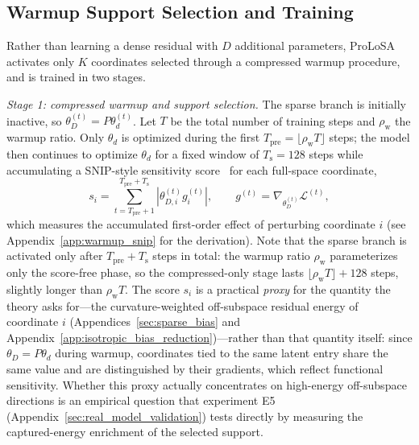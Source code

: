 \subsection{Warmup Support Selection and Training}
\label{sec:routed_sparse_adapter}

Rather than learning a dense residual with $D$ additional parameters, {ProLoSA} activates only $K$ coordinates selected through a compressed warmup procedure, and is trained in two stages.

\emph{Stage 1: compressed warmup and support selection.}
The sparse branch is initially inactive, so $\theta_D^{(t)}=P\theta_d^{(t)}$.
Let $T$ be the total number of training steps and $\rho_{\mathrm{w}}$ the warmup ratio.
Only $\theta_d$ is optimized during the first $T_{\mathrm{pre}}=\lfloor\rho_{\mathrm{w}}T\rfloor$ steps; the model then continues to optimize $\theta_d$ for a fixed window of $T_{\mathrm{s}}=128$ steps while accumulating a SNIP-style sensitivity score~\citep{lee2018snip,he2022sparseadapter} for each full-space coordinate,
\begin{equation}
s_i
=
\sum_{t=T_{\mathrm{pre}}+1}^{T_{\mathrm{pre}}+T_{\mathrm{s}}}
\left|
\theta_{D,i}^{(t)}
g_i^{(t)}
\right|,
\qquad
g^{(t)}=\nabla_{\theta_D^{(t)}}\mathcal{L}^{(t)},
\label{eq:warmup_snip_score}
\end{equation}
which measures the accumulated first-order effect of perturbing coordinate $i$ (see Appendix~\ref{app:warmup_snip} for the derivation).
Note that the sparse branch is activated only after $T_{\mathrm{pre}}+T_{\mathrm{s}}$ steps in total: the warmup ratio $\rho_{\mathrm{w}}$ parameterizes only the score-free phase, so the compressed-only stage lasts $\lfloor\rho_{\mathrm{w}}T\rfloor+128$ steps, slightly longer than $\rho_{\mathrm{w}}T$.
The score $s_i$ is a practical \emph{proxy} for the quantity the theory asks for---the curvature-weighted off-subspace residual energy of coordinate $i$ (Appendices~\ref{sec:sparse_bias} and Appendix~\ref{app:isotropic_bias_reduction})---rather than that quantity itself: since $\theta_D=P\theta_d$ during warmup, coordinates tied to the same latent entry share the same value and are distinguished by their gradients, which reflect functional sensitivity.
Whether this proxy actually concentrates on high-energy off-subspace directions is an empirical question that experiment E5 (Appendix~\ref{sec:real_model_validation}) tests directly by measuring the captured-energy enrichment of the selected support.

